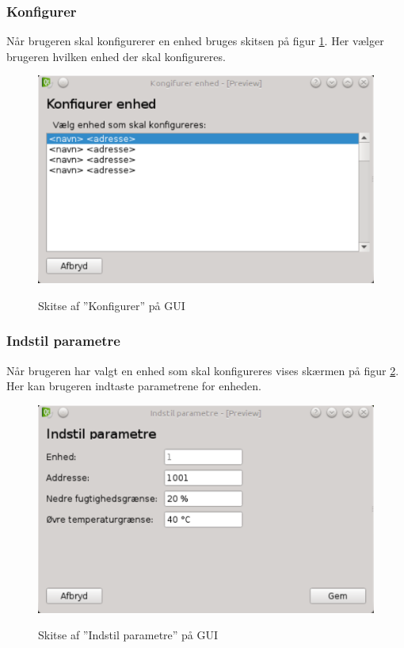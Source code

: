 \subsubsection{Konfigurer}
Når brugeren skal konfigurerer en enhed bruges skitsen på figur \ref{fig:GUI-konfigurer}. Her vælger brugeren hvilken enhed der skal konfigureres.

\begin{figure}[htbp] \centering
{\includegraphics[scale=0.5]{filer/pics/GUI/Konfigurer-enhed}}
\caption{Skitse af ''Konfigurer'' på GUI}
\label{fig:GUI-konfigurer}
\end{figure}

\subsubsection{Indstil parametre}
Når brugeren har valgt en enhed som skal konfigureres vises skærmen på figur \ref{fig:GUI-indstil-parametre}. Her kan brugeren indtaste parametrene for enheden.

\begin{figure}[htbp] \centering
{\includegraphics[scale=0.5]{filer/pics/GUI/Indstil-parametre}}
\caption{Skitse af ''Indstil parametre'' på GUI}
\label{fig:GUI-indstil-parametre}
\end{figure}

